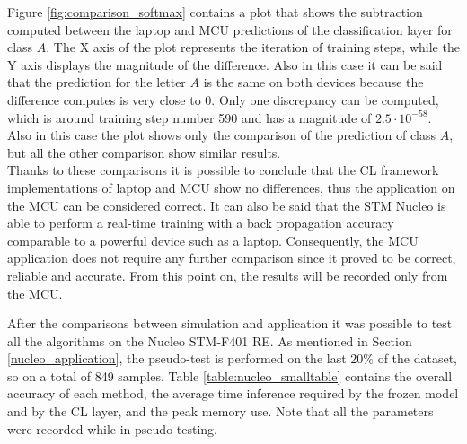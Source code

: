 \documentclass[12pt]{report}
\begin{document}
Figure \ref{fig:comparison_softmax} contains a plot that shows the subtraction computed between the laptop and MCU predictions of the classification layer for class $A$. The X axis of the plot represents the iteration of training steps, while the Y axis displays the magnitude of the difference. Also in this case it can be said that the prediction for the letter $A$ is the same on both devices because the difference computes is very close to 0. Only one discrepancy can be computed, which is around training step number 590 and has a magnitude of $2.5 \cdot 10^{-58}$. Also in this case the plot shows only the comparison of the prediction of class $A$, but all the other comparison show similar results.\\
Thanks to these comparisons it is possible to conclude that the CL framework implementations of laptop and MCU show no differences, thus the application on the MCU can be considered correct. It can also be said that the STM Nucleo is able to perform a real-time training with a back propagation accuracy comparable to a powerful device such as a laptop. Consequently, the MCU application does not require any further comparison since it proved to be correct, reliable and accurate. From this point on, the results will be recorded only from the MCU.\bigskip

After the comparisons between simulation and application it was possible to test all the algorithms on the Nucleo STM-F401 RE. As mentioned in Section \ref{nucleo_application}, the pseudo-test is performed on the last $20\%$ of the dataset, so on a total of 849 samples. Table \ref{table:nucleo_smalltable} contains the overall accuracy of each method, the average time inference required by the frozen model and by the CL layer, and the peak memory use. Note that all the parameters were recorded while in pseudo testing. \\
\end{document}

